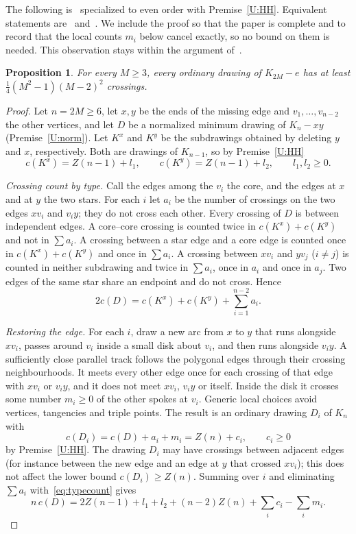 \documentclass[11pt,a4paper]{article}
\newtheorem{proposition}[theorem]{Proposition}
\theoremstyle{definition}
\theoremstyle{remark}
\numberwithin{equation}{section}
\begin{document}
The following is~\cite[Theorem~3.2]{OWH} specialized to even order with Premise~\ref{U:HH}. Equivalent statements are~\cite[Theorem~3.3]{OWH} and~\cite[Theorem~2]{ChiaLee}. We include the proof so that the paper is complete and to record that the local counts $m_i$ below cancel exactly, so no bound on them is needed. This observation stays within the argument of~\cite{OWH}.

\begin{proposition}\label{prop:even}
For every $M\ge3$, every ordinary drawing of $K_{2M}-e$ has at least $\frac14(M^2-1)(M-2)^2$ crossings.
\end{proposition}

\begin{proof}
Let $n=2M\ge6$, let $x,y$ be the ends of the missing edge and $v_1,\dots,v_{n-2}$ the other vertices, and let $D$ be a normalized minimum drawing of $K_n-xy$ (Premise~\ref{U:norm}). Let $K^x$ and $K^y$ be the subdrawings obtained by deleting $y$ and $x$, respectively. Both are drawings of $K_{n-1}$, so by Premise~\ref{U:HH}
\[
c(K^x)=Z(n-1)+l_1,\qquad c(K^y)=Z(n-1)+l_2,\qquad l_1,l_2\ge0.
\]

\emph{Crossing count by type.} Call the edges among the $v_i$ the core, and the edges at $x$ and at $y$ the two stars. For each $i$ let $a_i$ be the number of crossings on the two edges $xv_i$ and $v_iy$; they do not cross each other. Every crossing of $D$ is between independent edges. A core--core crossing is counted twice in $c(K^x)+c(K^y)$ and not in $\sum a_i$. A crossing between a star edge and a core edge is counted once in $c(K^x)+c(K^y)$ and once in $\sum a_i$. A crossing between $xv_i$ and $yv_j$ ($i\ne j$) is counted in neither subdrawing and twice in $\sum a_i$, once in $a_i$ and once in $a_j$. Two edges of the same star share an endpoint and do not cross. Hence
\begin{equation}\label{eq:typecount}
2c(D)=c(K^x)+c(K^y)+\sum_{i=1}^{n-2}a_i .
\end{equation}

\emph{Restoring the edge.} For each $i$, draw a new arc from $x$ to $y$ that runs alongside $xv_i$, passes around $v_i$ inside a small disk about $v_i$, and then runs alongside $v_iy$. A sufficiently close parallel track follows the polygonal edges through their crossing neighbourhoods. It meets every other edge once for each crossing of that edge with $xv_i$ or $v_iy$, and it does not meet $xv_i$, $v_iy$ or itself. Inside the disk it crosses some number $m_i\ge0$ of the other spokes at $v_i$. Generic local choices avoid vertices, tangencies and triple points. The result is an ordinary drawing $D_i$ of $K_n$ with
\[
c(D_i)=c(D)+a_i+m_i=Z(n)+c_i,\qquad c_i\ge0
\]
by Premise~\ref{U:HH}. The drawing $D_i$ may have crossings between adjacent edges (for instance between the new edge and an edge at $y$ that crossed $xv_i$); this does not affect the lower bound $c(D_i)\ge Z(n)$. Summing over $i$ and eliminating $\sum a_i$ with~\eqref{eq:typecount} gives
\begin{equation}\label{eq:even1}
n\,c(D)=2Z(n-1)+l_1+l_2+(n-2)Z(n)+\sum_ic_i-\sum_im_i .
\end{equation}


\end{proof}
\end{document}
